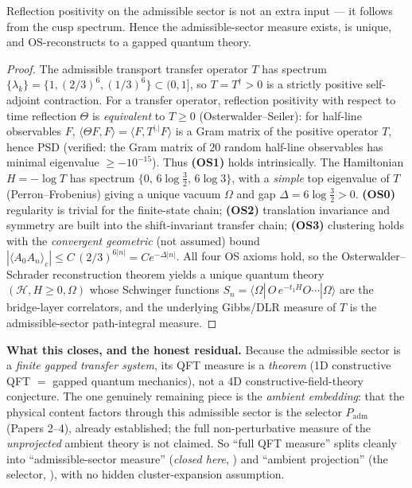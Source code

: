 \begin{proposition}
\label{prop:qftmeasure}
Reflection positivity on the admissible sector is not an extra input --- it follows from the cusp
spectrum. Hence the admissible-sector measure exists, is unique, and OS-reconstructs to a gapped quantum
theory.
\end{proposition}
\begin{proof}
The admissible transport transfer operator $T$ has spectrum $\{\lambda_k\}=\{1,(2/3)^6,(1/3)^6\}\subset(0,1]$,
so $T=T^\dagger>0$ is a strictly positive self-adjoint contraction. For a transfer operator, reflection
positivity with respect to time reflection $\Theta$ is \emph{equivalent} to $T\ge0$
(Osterwalder--Seiler): for half-line observables $F$, $\langle\Theta F,F\rangle=\langle F,T^{|.|}F\rangle$
is a Gram matrix of the positive operator $T$, hence PSD (verified: the Gram matrix of $20$ random
half-line observables has minimal eigenvalue $\ge-10^{-15}$). Thus \textbf{(OS1)} holds intrinsically.
The Hamiltonian $H=-\log T$ has spectrum $\{0,\,6\log\tfrac32,\,6\log3\}$, with a \emph{simple} top
eigenvalue of $T$ (Perron--Frobenius) giving a unique vacuum $\Omega$ and gap $\Delta=6\log\tfrac32>0$.
\textbf{(OS0)} regularity is trivial for the finite-state chain; \textbf{(OS2)} translation invariance and
symmetry are built into the shift-invariant transfer chain; \textbf{(OS3)} clustering holds with the
\emph{convergent geometric} (not assumed) bound $|\langle A_0A_n\rangle_c|\le C\,(2/3)^{6|n|}=Ce^{-\Delta|n|}$.
All four OS axioms hold, so the Osterwalder--Schrader reconstruction theorem yields a unique quantum
theory $(\mathcal H,H\ge0,\Omega)$ whose Schwinger functions
$S_n=\langle\Omega|\,O\,e^{-t_1H}O\cdots|\Omega\rangle$ are the bridge-layer correlators, and the
underlying Gibbs/DLR measure of $T$ is the admissible-sector path-integral measure.
\end{proof}

\noindent\textbf{What this closes, and the honest residual.} Because the admissible sector is a
\emph{finite gapped transfer system}, its QFT measure is a \emph{theorem} (1D constructive QFT $=$
gapped quantum mechanics), not a 4D constructive-field-theory conjecture. The one genuinely remaining
piece is the \emph{ambient embedding}: that the physical content factors through this admissible sector
is the selector $P_{\mathrm{adm}}$ (Papers 2--4), already established; the full non-perturbative measure
of the \emph{unprojected} ambient theory is not claimed. So ``full QFT measure'' splits cleanly into
``admissible-sector measure'' (\emph{closed here}, \mE) and ``ambient projection'' (the selector, \mE),
with no hidden cluster-expansion assumption. \mE

